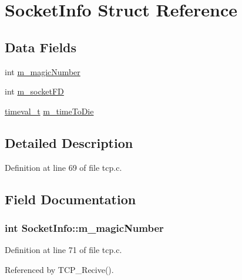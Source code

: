 \hypertarget{structSocketInfo}{}\section{Socket\+Info Struct Reference}
\label{structSocketInfo}
\subsection*{Data Fields}
\begin{DoxyCompactItemize}
\item 
int \hyperlink{structSocketInfo_abbee40c2642306ce8f626f2324527522}{m\+\_\+magic\+Number}
\item 
int \hyperlink{structSocketInfo_a2235bbbc0f81915ee129742348a85d97}{m\+\_\+socket\+FD}
\item 
\hyperlink{tcp_8c_aeba0d8f51eb0a83c2b01ecf27e0b3260}{timeval\+\_\+t} \hyperlink{structSocketInfo_a668a08c14a012d8609a7867d68ebcc80}{m\+\_\+time\+To\+Die}
\end{DoxyCompactItemize}


\subsection{Detailed Description}


Definition at line 69 of file tcp.\+c.



\subsection{Field Documentation}
\subsubsection[{\texorpdfstring{m\+\_\+magic\+Number}{m_magicNumber}}]{\setlength{\rightskip}{0pt plus 5cm}int Socket\+Info\+::m\+\_\+magic\+Number}\hypertarget{structSocketInfo_abbee40c2642306ce8f626f2324527522}{}\label{structSocketInfo_abbee40c2642306ce8f626f2324527522}


Definition at line 71 of file tcp.\+c.



Referenced by T\+C\+P\+\_\+\+Recive().

